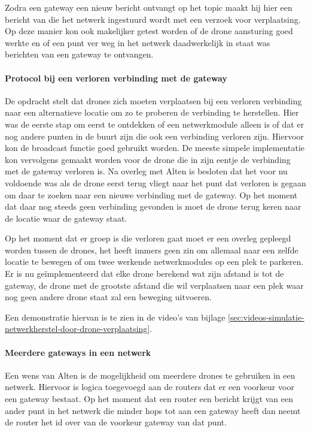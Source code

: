 \documentclass[a4paper, 11pt, oneside]{report}
\begin{document}
Zodra een gateway een nieuw bericht ontvangt op het topic maakt hij hier een bericht van die het netwerk ingestuurd wordt met een verzoek voor verplaatsing. Op deze manier kon ook makelijker getest worden of de drone aansturing goed werkte en of een punt ver weg in het netwerk daadwerkelijk in staat was berichten van een gateway te ontvangen.

\paragraph{Protocol bij een verloren verbinding met de gateway}
De opdracht stelt dat drones zich moeten verplaatsen bij een verloren verbinding naar een alternatieve locatie om zo te proberen de verbinding te herstellen. 
Hier was de eerste stap om eerst te ontdekken of een netwerkmodule alleen is of dat er nog andere punten in de buurt zijn die ook een verbinding verloren zijn. 
Hiervoor kon de broadcast functie goed gebruikt worden.
 De meeste simpele implementatie kon vervolgens gemaakt worden voor de drone die in zijn eentje de verbinding met de gateway verloren is. 
Na overleg met Alten is besloten dat het voor nu voldoende was als de drone eerst terug vliegt naar het punt dat verloren is gegaan om daar te zoeken naar een nieuwe verbinding met de gateway.
Op het moment dat daar nog steeds geen verbinding gevonden is moet de drone terug keren naar de locatie waar de gateway staat.   

Op het moment dat er groep is die verloren gaat moet er een overleg gepleegd worden tussen de drones, het heeft immers geen zin om allemaal naar een zelfde locatie te bewegen of om twee werkende netwerkmodules op een plek te parkeren. 
Er is nu geïmplementeerd dat elke drone berekend wat zijn afstand is tot de gateway, de drone met de grootste afstand die wil verplaatsen naar een plek waar nog geen andere drone staat zal een beweging uitvoeren.  

Een demonstratie hiervan is te zien in de video's van bijlage \ref{sec:videos-simulatie-netwerkherstel-door-drone-verplaatsing}.
   
\paragraph{Meerdere gateways in een netwerk}
Een wens van Alten is de mogelijkheid om meerdere drones te gebruiken in een netwerk. 
Hiervoor is logica toegevoegd aan de routers dat er een voorkeur voor een gateway bestaat.
Op het moment dat een router een bericht krijgt van een ander punt in het netwerk die minder hops tot aan een gateway heeft dan neemt de router het id over van de voorkeur gateway van dat punt. 
\end{document}
